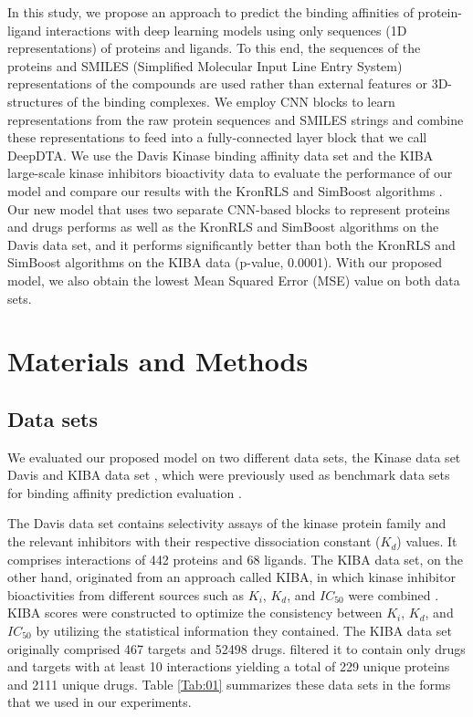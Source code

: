 \documentclass[11pt,letterpaper]{article}
\begin{document}
In this study, we propose an approach to predict the binding affinities of protein-ligand interactions with deep learning models using only  sequences (1D representations) of proteins and ligands. To this end, the sequences of the proteins and SMILES (Simplified Molecular Input Line Entry System) representations of the compounds are used rather than external features or 3D-structures of the binding complexes. We employ CNN blocks to learn representations from the raw protein sequences and SMILES strings and combine these representations to feed into a fully-connected layer block that we call DeepDTA. We use the Davis Kinase binding affinity data set \cite{davis2011comprehensive} and the KIBA large-scale kinase inhibitors bioactivity data \cite{tang2014making, he2017simboost} to evaluate the performance of our model and compare our results with  the KronRLS \cite{pahikkala2014toward} and SimBoost algorithms  \cite{he2017simboost}.  Our new model that uses two separate CNN-based blocks to represent proteins and drugs performs as well as the KronRLS  and SimBoost algorithms on the Davis data set, and  it performs significantly better than both the KronRLS and SimBoost algorithms  on the KIBA data (p-value, 0.0001).  With our proposed model, we also obtain the lowest Mean Squared Error (MSE) value on both data sets.



\section*{Materials and Methods}

\subsection*{Data sets}
We evaluated our proposed model on two different data sets, the Kinase data set Davis \cite{davis2011comprehensive}  and KIBA data set \cite{tang2014making}, which were previously used as benchmark data sets for binding affinity prediction evaluation \cite{pahikkala2014toward,he2017simboost}. 

The Davis data set contains selectivity assays of the kinase protein family and the relevant inhibitors with their respective dissociation constant ($K_d$) values. It comprises interactions of 442 proteins and 68 ligands. The KIBA data set, on the other hand, originated from an approach called KIBA, in which kinase inhibitor bioactivities from different sources such as $K_i$, $K_d$, and $IC_{50}$ were combined \cite{tang2014making}.  KIBA scores were constructed to optimize the consistency between $K_i$, $K_d$, and $IC_{50}$ by utilizing the statistical information they contained. The KIBA data set originally comprised 467 targets and 52498 drugs. \cite{he2017simboost}  filtered it to contain only drugs and targets with at least 10 interactions yielding  a total of 229 unique proteins and 2111 unique drugs. Table \ref{Tab:01} summarizes these data sets in the forms that we used in our experiments.
\end{document}

